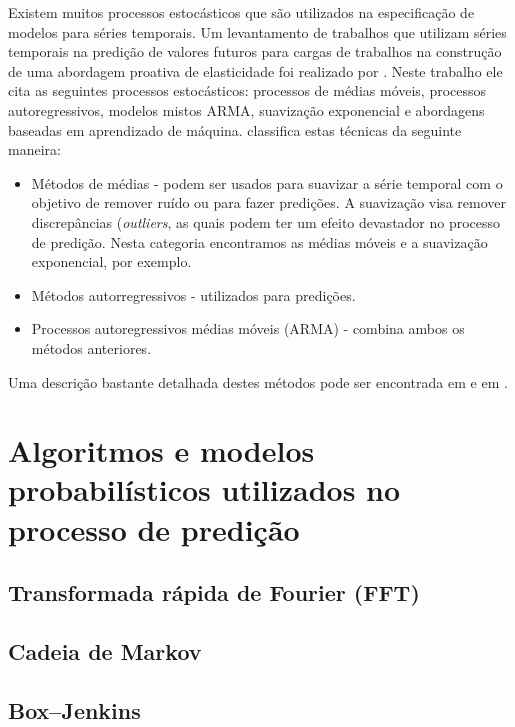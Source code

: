 \documentclass[twoside,english,brazilian]{UNISINOSmonografia}
\begin{document}
Existem muitos processos estocásticos que são utilizados na especificação de modelos para séries temporais. Um levantamento de trabalhos que utilizam séries temporais na predição de valores futuros para cargas de trabalhos na construção de uma abordagem proativa de elasticidade foi realizado por \citep{Lorido-botr2012}. Neste trabalho ele cita as seguintes processos estocásticos: processos de médias móveis, processos autoregressivos, modelos mistos ARMA, suavização exponencial e abordagens baseadas em aprendizado de máquina.\citep{Lorido-botr2012} classifica estas técnicas da seguinte maneira:

\begin{itemize}
	\item Métodos de médias - podem ser usados para suavizar a série temporal com o objetivo de remover ruído ou para fazer predições. A suavização visa remover discrepâncias (\textit{outliers}, as quais podem ter um efeito devastador no processo de predição. Nesta categoria encontramos as médias móveis e a suavização exponencial, por exemplo.
	\item Métodos autorregressivos - utilizados para predições. %
	\item Processos autoregressivos médias móveis (ARMA) - combina ambos os métodos anteriores.
\end{itemize}
Uma descrição bastante detalhada destes métodos pode ser encontrada em \cite{Lee2009} e em \cite{Shumway2000}.

\section{Algoritmos e modelos probabilísticos utilizados no processo de predição}

\subsection{Transformada rápida de Fourier (FFT)}

\subsection{Cadeia de Markov}

\subsection{Box–Jenkins}
\end{document}
